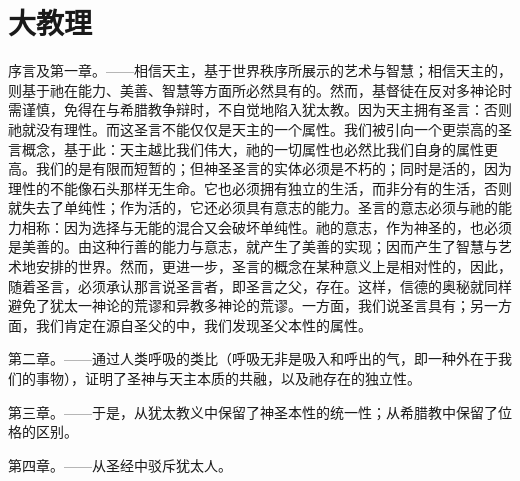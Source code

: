 
\chapter{大教理}


\par

序言及第一章。——相信天主，基于世界秩序所展示的艺术与智慧；相信天主的，则基于祂在能力、美善、智慧等方面所必然具有的。然而，基督徒在反对多神论时需谨慎，免得在与希腊教争辩时，不自觉地陷入犹太教。因为天主拥有圣言：否则祂就没有理性。而这圣言不能仅仅是天主的一个属性。我们被引向一个更崇高的圣言概念，基于此：天主越比我们伟大，祂的一切属性也必然比我们自身的属性更高。我们的是有限而短暂的；但神圣圣言的实体必须是不朽的；同时是活的，因为理性的不能像石头那样无生命。它也必须拥有独立的生活，而非分有的生活，否则就失去了单纯性；作为活的，它还必须具有意志的能力。圣言的意志必须与祂的能力相称：因为选择与无能的混合又会破坏单纯性。祂的意志，作为神圣的，也必须是美善的。由这种行善的能力与意志，就产生了美善的实现；因而产生了智慧与艺术地安排的世界。然而，更进一步，圣言的概念在某种意义上是相对性的，因此，随着圣言，必须承认那言说圣言者，即圣言之父，存在。这样，信德的奥秘就同样避免了犹太一神论的荒谬和异教多神论的荒谬。一方面，我们说圣言具有；另一方面，我们肯定在源自圣父的中，我们发现圣父本性的属性。\par

第二章。——通过人类呼吸的类比（呼吸无非是吸入和呼出的气，即一种外在于我们的事物），证明了圣神与天主本质的共融，以及祂存在的独立性。\par

第三章。——于是，从犹太教义中保留了神圣本性的统一性；从希腊教中保留了位格的区别。\par

第四章。——从圣经中驳斥犹太人。\par

\par

